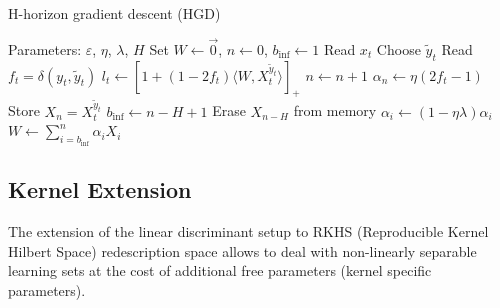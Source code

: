 \documentclass[preprint,12pt,authoryear]{elsarticle}
\begin{document}
\begin{algorithm}[t!]
	\caption{H-horizon gradient descent (HGD)}\label{algo:HGD}
	\begin{algorithmic}
		
		\STATE Parameters:  $\varepsilon$, $\eta$, $\lambda$, $H$
		\STATE Set $W \leftarrow \vec{0}$, $n \leftarrow 0$, $b_\text{inf}\leftarrow 1$
		\STATE Read $x_t$
		\STATE Choose $\tilde{y}_t$		\STATE Read $f_t = \delta(y_t,\tilde{y}_t)$
		\STATE $l_t \leftarrow \left[ 1+(1-2f_t)\langle W,X_t^{\tilde{y}_t}\rangle\right]_{+}$ 
		\STATE $n \leftarrow n + 1$
		\STATE $\alpha_{n} \leftarrow \eta (2 f_t-1)$
		\STATE Store $X_{n} = X_t^{\tilde{y}_t}$
		\STATE $b_\text{inf} \leftarrow n - H + 1$
		\STATE Erase $X_{n - H }$ from memory
		\ENDIF 
		\STATE $\alpha_i \leftarrow (1 - \eta\lambda) \alpha_i$
		\ENDFOR			
		\STATE $W \leftarrow \sum_{i=b_\text{inf}}^n \alpha_i X_{i}$
		\ENDIF
		\ENDFOR
	\end{algorithmic}
\end{algorithm}


\subsection{Kernel Extension}
The extension of the linear discriminant setup to 
RKHS (Reproducible Kernel Hilbert Space) redescription space 
allows to deal with non-linearly separable learning sets at the cost of additional free parameters (kernel specific parameters). 
\end{document}
